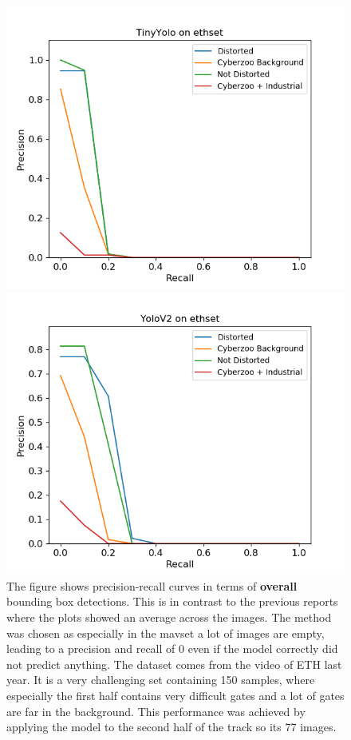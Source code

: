 \documentclass{article}
\begin{document}
\begin{figure}[h]
	\centering
	\begin{minipage}{0.45\textwidth}
		\centering
		\includegraphics[width=\textwidth]{fig/tiny_eth}
	\end{minipage}
	\begin{minipage}{0.45\textwidth}
		\centering
		\includegraphics[width=\textwidth]{fig/yolov2_eth}
	\end{minipage}
	\label{fig:ethset}
	\caption{The figure shows precision-recall curves in terms of \textbf{overall} bounding box detections. This is in contrast to the previous reports where the plots showed an average across the images. The method was chosen as especially in the mavset a lot of images are empty, leading to a precision and recall of 0 even if the model correctly did not predict anything.
	The dataset comes from the video of ETH last year. It is a very challenging set containing 150 samples, where especially the first half contains very difficult gates and a lot of gates are far in the background. This performance was achieved by applying the model to the second half of the track so its 77 images.}
\end{figure}
\end{document}
